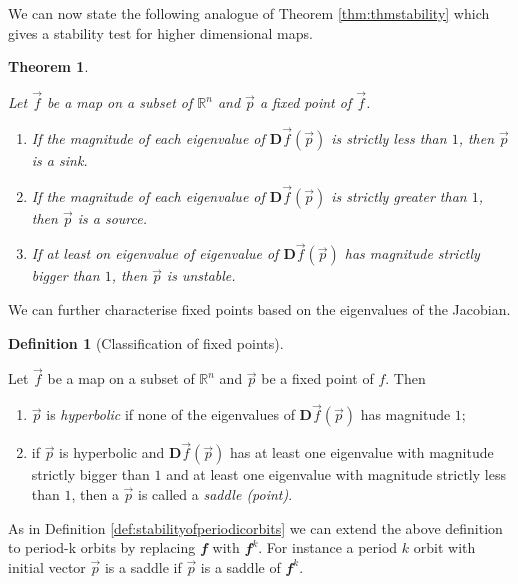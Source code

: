 \documentclass[
  a4paper,
  oneside,
  final]{krantz}
\providecommand{\tightlist}{%
  \setlength{\itemsep}{0pt}\setlength{\parskip}{0pt}}
\newcommand{\R}{\mathbb{R}}
\renewcommand{\v}[1]{{\mathbfit{#1}}}
\newcommand{\jacob}{{\mathbf{D}}\vec{f}}
\newtheorem{theorem}{Theorem}[chapter]
\theoremstyle{definition}
\newtheorem{definition}{Definition}[chapter]
\theoremstyle{definition}
\theoremstyle{definition}
\theoremstyle{definition}
\theoremstyle{remark}
\begin{document}
We can now state the following analogue of Theorem \ref{thm:thmstability} which gives a stability test for higher dimensional maps.

\begin{theorem}
\protect\hypertarget{thm:stabilityhigherdim}{}\label{thm:stabilityhigherdim}

Let \(\vec{f}\) be a map on a subset of \(\R^n\) and \(\vec{p}\) a fixed point of \(\vec{f}\).

\begin{enumerate}
\def\labelenumi{\arabic{enumi}.}
\tightlist
\item
  If the magnitude of each eigenvalue of \(\jacob(\vec{p})\) is strictly less than \(1\), then \(\vec{p}\) is a sink.
\item
  If the magnitude of each eigenvalue of \(\jacob(\vec{p})\) is strictly greater than \(1\), then \(\vec{p}\) is a source.
\item
  If at least on eigenvalue of eigenvalue of \(\jacob(\vec{p})\) has magnitude strictly bigger than \(1\), then \(\vec{p}\) is unstable.
\end{enumerate}

\end{theorem}

We can further characterise fixed points based on the eigenvalues of the Jacobian.

\begin{definition}[Classification of fixed points]
\protect\hypertarget{def:classificationoffixedpoints}{}\label{def:classificationoffixedpoints}

Let \(\vec{f}\) be a map on a subset of \(\R^{n}\) and \(\vec{p}\) be a fixed point of \(f\). Then

\begin{enumerate}
\def\labelenumi{\arabic{enumi}.}
\tightlist
\item
  \(\vec{p}\) is \emph{hyperbolic} if none of the eigenvalues of \(\jacob(\vec{p})\) has magnitude \(1\);
\item
  if \(\vec{p}\) is hyperbolic and \(\jacob(\vec{p})\) has at least one eigenvalue with magnitude strictly bigger than \(1\) and at least one eigenvalue with magnitude strictly less than \(1\), then a \(\vec{p}\) is called a \emph{saddle (point)}.
\end{enumerate}

\end{definition}

As in Definition \ref{def:stabilityofperiodicorbits} we can extend the above definition to period-k orbits by replacing \(\v{f}\) with \(\v{f}^{k}\). For instance a period \(k\) orbit with initial vector \(\vec{p}\) is a saddle if \(\vec{p}\) is a saddle of \(\v{f}^{k}\).
\end{document}
